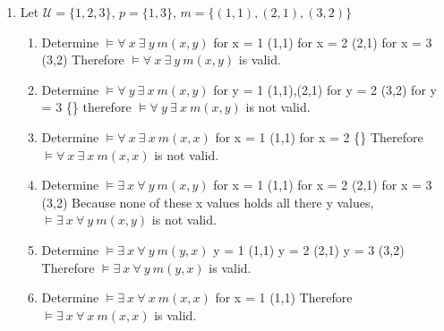 \documentclass{article}
\begin{document}
\begin{enumerate}
\begin{enumerate}
\end{enumerate}
\item Let $\mathcal{U} = \{1,2,3\}$, $p = \{1,3\}$, $m = \{(1,1),(2,1),(3,2)\}$
\begin{enumerate}
\item Determine $\models \forall\ x\ \exists\ y\ m(x,y)$ \newline
for x = 1 \newline
(1,1) \newline
for x = 2
(2,1) \newline
for x = 3
(3,2) \newline
Therefore $\models \forall\ x\ \exists\ y\ m(x,y)$ is valid.
\item Determine $\models \forall\ y\ \exists\ x\ m(x,y)$ \newline
for y = 1 \newline
(1,1),(2,1) \newline
for y = 2 \newline
(3,2) \newline
for y = 3 \newline
\{\} \newline
therefore $\models \forall\ y\ \exists\ x\ m(x,y)$ is not valid.
\item Determine $\models \forall\ x\ \exists\ x\ m(x,x)$ \newline
for x = 1 \newline
(1,1) \newline
for x = 2 \newline
\{\} \newline
Therefore $\models \forall\ x\ \exists\ x\ m(x,x)$ is not valid.
\item Determine $\models \exists \ x\ \forall\ y\ m(x,y)$ \newline
for x = 1 \newline
(1,1) \newline
for x = 2 \newline
(2,1) \newline
for x = 3 \newline
(3,2) \newline
Because none of these x values holds all there y values, $\models \exists \ x\ \forall\ y\ m(x,y)$ is not valid.
\item Determine $\models \exists \ x\ \forall\ y\ m(y,x)$ \newline
y = 1 \newline
(1,1) \newline
y = 2 \newline 
(2,1) \newline 
y = 3 \newline 
(3,2) \newline
Therefore $\models \exists \ x\ \forall\ y\ m(y,x)$ is valid.
\item Determine $\models \exists \ x\ \forall\ x\ m(x,x)$ \newline
for x = 1 \newline
(1,1) \newline
Therefore $\models \exists \ x\ \forall\ x\ m(x,x)$ is valid.


\end{enumerate}
\end{enumerate}
\end{document}
